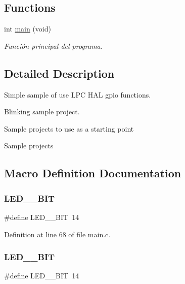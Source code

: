 \subsection*{Functions}
\begin{DoxyCompactItemize}
\item 
int \hyperlink{group__samples_ga840291bc02cba5474a4cb46a9b9566fe}{main} (void)
\begin{DoxyCompactList}\small\item\em Función principal del programa. \end{DoxyCompactList}\end{DoxyCompactItemize}


\subsection{Detailed Description}
Simple sample of use L\+PC H\+AL gpio functions. 

Blinking sample project.

Sample projects to use as a starting point

Sample projects 

\subsection{Macro Definition Documentation}
\mbox{\label{group__samples_ga3fe9954e37c14ff0232f26822e5df035}} 
\subsubsection{\texorpdfstring{L\+E\+D\+\_\+\_\+\+B\+IT}{LED\_1\_BIT}\hspace{0.1cm}{\footnotesize\ttfamily [1/2]}}
{\footnotesize\ttfamily \#define L\+E\+D\+\_\+\_\+\+B\+IT~14}



Definition at line 68 of file main.\+c.

\mbox{\label{group__samples_ga3fe9954e37c14ff0232f26822e5df035}} 
\subsubsection{\texorpdfstring{L\+E\+D\+\_\+\_\+\+B\+IT}{LED\_1\_BIT}\hspace{0.1cm}{\footnotesize\ttfamily [2/2]}}
{\footnotesize\ttfamily \#define L\+E\+D\+\_\+\_\+\+B\+IT~14}



